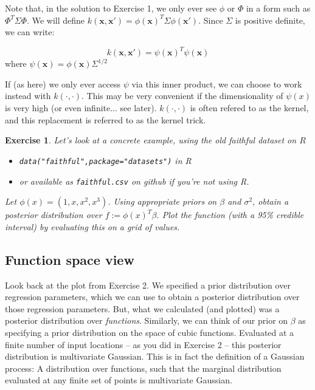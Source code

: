 \documentclass[twoside]{article}
\newcounter{lecnum}
\newtheorem{exercise}{Exercise}[lecnum]
\begin{document}
Note that, in the solution to Exercise 1, we only ever see $\phi$ or $\Phi$ in a form such as $\Phi^T\Sigma\Phi$. We will define $k(\mathbf{x},\mathbf{x}') = \phi(\mathbf{x})^T\Sigma\phi(\mathbf{x}')$. Since $\Sigma$ is positive definite, we can write:

$$k(\mathbf{x},\mathbf{x}') = \psi(\mathbf{x})^T\psi(\mathbf{x})$$
where $\psi(\mathbf{x}) = \phi(\mathbf{x})\Sigma^{1/2}$

If (as here) we only ever access $\psi$ via this inner product, we can choose to work instead with $k(\cdot,\cdot)$. This may be very convenient if the dimensionality of $\psi(x)$ is very high (or even infinite... see later). $k(\cdot,\cdot)$ is often refered to as the kernel, and this replacement is referred to as the kernel trick.

\begin{exercise}

  Let's look at a concrete example, using the old faithful dataset on $R$
  \begin{itemize}
  \item \texttt{data("faithful",package="datasets")} in R
  \item or available as \texttt{faithful.csv} on github if you're not using R.
  \end{itemize}

  Let $\phi(x) = (1,x,x^2,x^3)$. Using appropriate priors on $\beta$ and $\sigma^2$, obtain a posterior distribution over $f:=\phi(x)^T\beta$. Plot the function (with a 95\% credible interval) by evaluating this on a grid of values.
\end{exercise}
  


\subsection{Function space view}

Look back at the plot from Exercise 2. We specified a prior distribution over regression parameters, which we can use to obtain a posterior distribution over those regression parameters. But, what we calculated (and plotted) was a posterior distribution over \textit{functions}. Similarly, we can think of our prior on $\beta$ as specifying a prior distribution on the space of cubic functions. Evaluated at a finite number of input locations -- as you did in Exercise 2 -- this posterior distribution is multivariate Gaussian. This is in fact the definition of a Gaussian process: A distribution over functions, such that the marginal distribution evaluated at any finite set of points is multivariate Gaussian.
\end{document}
